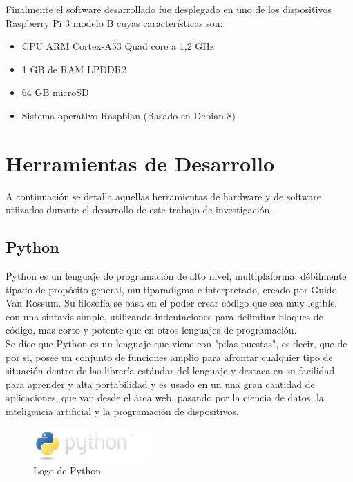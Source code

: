 Finalmente el software desarrollado fue desplegado en uno de los dispositivos Raspberry Pi 3 modelo B cuyas características son:
\begin{itemize}
\item CPU ARM Cortex-A53 Quad core a 1,2 GHz
\item 1 GB de RAM LPDDR2
\item 64 GB microSD 
\item Sistema operativo Raspbian (Basado en Debian 8) 
\end{itemize}

\section{Herramientas de Desarrollo}
A continuación se detalla aquellas herramientas de hardware y de software utiizados durante el desarrollo de este trabajo de investigación.

\subsection{Python}
Python es un lenguaje de programación de alto nivel, multiplaforma,  débilmente tipado de propósito general, multiparadigma e interpretado\cite{whatspython}, creado por Guido Van Rossum. Su filosofía se basa en el poder crear código que sea muy legible, con una sintaxis simple, utilizando indentaciones para delimitar bloques de código, mas corto y potente que en otros lenguajes de programación.\cite{Guido}\\

Se dice que Python es un lenguaje que viene con "pilas puestas"\cite{pep206}, es decir, que de por si, posee un conjunto de funciones amplio para afrontar cualquier tipo de situación dentro de las librería estándar del lenguaje y destaca en su facilidad para aprender y alta portabilidad y es usado en un una gran cantidad de aplicaciones, que van desde el área web, pasando por la ciencia de datos, la inteligencia artificial y la programación de dispositivos.  

\begin{figure}[ht]
\centering
\includegraphics[width=0.4\textwidth]{Figuras/python-logo.png}
\caption{\label{fig:python-logo}Logo de Python}
\vspace*{-10pt}
\end{figure}

